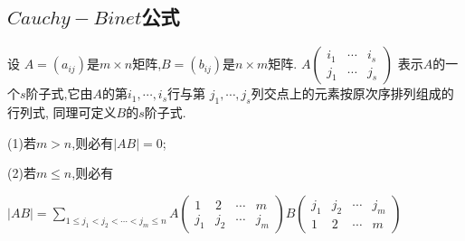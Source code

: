 \subsection{\texorpdfstring{$Cauchy-Binet$}{\textit{Cauchy-Binet}}公式}

\begin{theorem}\label{thm:Cauchy-Binet}
  设 $A=(a_{ij})$是$m \times n$矩阵,$B=(b_{ij})$是$n \times m$矩阵.
  $A\left(\begin{smallmatrix}i_1 & \cdots & i_s \\
      j_1 & \cdots & j_s \end{smallmatrix}\right)$
  表示$A$的一个$s$阶子式,它由$A$的第$i_1, \cdots, i_s$行与第
  $j_1, \cdots, j_s$列交点上的元素按原次序排列组成的行列式,
  同理可定义$B$的$s$阶子式.\par
  (1)若$m>n$,则必有$\left\vert AB \right\vert=0$;\par
  (2)若$m \le n$,则必有\par
  $|AB|= \sum\limits_{1 \le j_1<j_2<\cdots<j_m \le n}
  A\left(\begin{smallmatrix}
      1 & 2 & \cdots & m \\
      j_1 & j_2 & \cdots & j_m \end{smallmatrix}\right)
  B\left(\begin{smallmatrix}
      j_1 & j_2 & \cdots & j_m\\
      1 & 2 & \cdots & m \end{smallmatrix}\right)$

\end{theorem}


